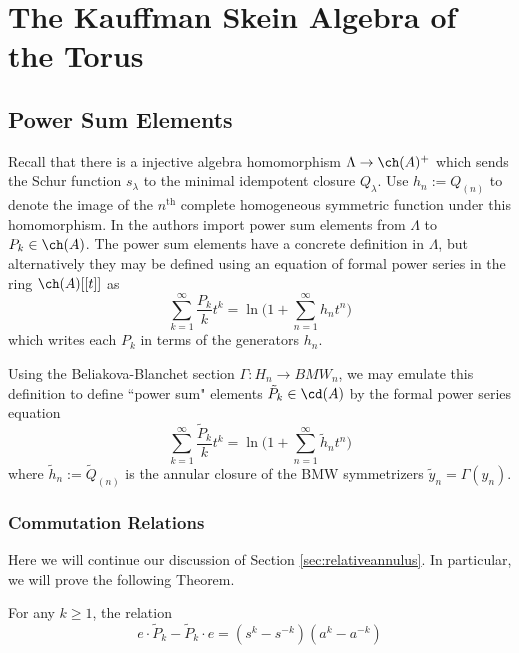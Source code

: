 \chapter{The Kauffman Skein Algebra of the Torus}



\section{Power Sum Elements}

Recall that there is a injective algebra homomorphism $\Lambda \to \ch(A)^+$ which sends the Schur function $s_\lambda$ to the minimal idempotent closure $Q_\lambda$. Use $h_n := Q_{(n)}$ to denote the image of the $n^\textrm{th}$ complete homogeneous symmetric function under this homomorphism. In  the authors import power sum elements from $\Lambda$ to $P_k \in \ch(A)$. The power sum elements have a concrete definition in $\Lambda$, but alternatively they may be defined using an equation of formal power series in the ring $\ch(A)[[t]]$ as
\begin{equation}
\sum_{k=1}^\infty \frac{P_k}{k} t^k = \ln \Bigg( 1 + \sum_{n=1}^\infty h_n t^n \Bigg)
\end{equation}
which writes each $P_k$ in terms of the generators $h_n$. 

Using the Beliakova-Blanchet section $\Gamma: H_n \to BMW_n$, we may emulate this definition to define ``power sum" elements $\tilde{P}_k \in \cd(A)$ by the formal power series equation
\begin{equation}
\sum_{k=1}^\infty \frac{\tilde{P}_k}{k} t^k = \ln \Bigg( 1 + \sum_{n=1}^\infty \tilde{h}_n t^n \Bigg)
\end{equation}
where $\tilde{h}_n := \tilde{Q}_{(n)}$ is the annular closure of the BMW symmetrizers $\tilde{y}_n = \Gamma(y_n)$.


\subsection{Commutation Relations} \label{sec:commurationrelations}

Here we will continue our discussion of Section \ref{sec:relativeannulus}. In particular, we will prove the following Theorem.

\begin{theorem} \label{thm:powersumcommutator}
For any $k \geq 1$, the relation
\[
e \cdot \tilde{P}_k - \tilde{P}_k \cdot e = (s^k - s^{-k}) (a^k - a^{-k})
\]
\end{theorem}


